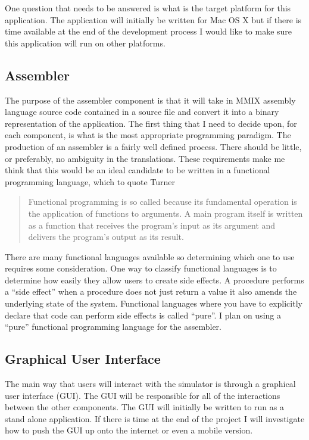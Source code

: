 \documentclass[11pt]{article} %
\begin{document}
One question that needs to be answered is what is the target platform for this application. The application will initially be written for Mac OS X but if there is time available at the end of the development process I would like to make sure this  application will run on other platforms.

\subsection{Assembler}
The purpose of the assembler component is that it will take in MMIX assembly language source code contained in a source file and convert it into a binary representation of the application.  The first thing that I need to decide upon, for each component, is what is the most appropriate programming paradigm.  The production of an assembler is a fairly well defined process.  There should be little, or preferably, no ambiguity in the translations.  These requirements make me think that this would be an ideal candidate to be written in a functional programming language, which to quote Turner~\cite{turner:why}
\begin{quote}Functional programming is so called because its fundamental operation is the application of functions to arguments. A main program itself is written as a function that receives the program’s input as its argument and delivers the program’s output as its result.\end{quote}
	
There are many functional languages available so determining which one to use requires some consideration.  One way to classify functional languages is to determine how easily they allow users to create side effects. A procedure performs a ``side effect'' when a procedure does not just return a value it also amends the underlying state of the system.   Functional languages where you have to explicitly declare that code can perform side effects is called ``pure''.  
I plan on using a ``pure'' functional programming language for the assembler.
\subsection{Graphical User Interface}
The main way that users will interact with the simulator is through a graphical user interface (GUI).  The GUI will be responsible for all of the interactions between the other components. The GUI will initially be written to run as a stand alone application.  If there is time at the end of the project I  will investigate how to push the GUI up onto the internet or even a mobile version.
\end{document}
